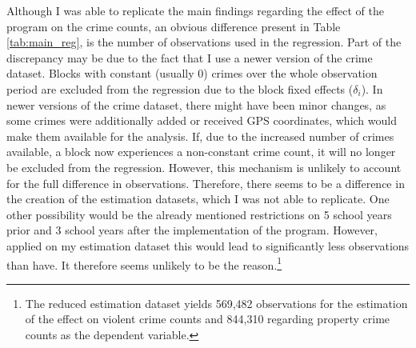 \documentclass[]{article}
\begin{document}
Although I was able to replicate the main findings regarding the effect of the program on the crime counts, an obvious difference present in Table \ref{tab:main_reg}, is the number of observations used in the regression. Part of the discrepancy may be due to the fact that I use a newer version of the crime dataset. Blocks with constant (usually 0) crimes over the whole observation period are excluded from the regression due to the block fixed effects ($\delta_i$). In newer versions of the crime dataset, there might have been minor changes, as some crimes were additionally added or received GPS coordinates, which would make them available for the analysis. If, due to the increased number of crimes available, a block now experiences a non-constant crime count, it will no longer be excluded from the regression. However, this mechanism is unlikely to account for the full difference in observations. Therefore, there seems to be a difference in the creation of the estimation datasets, which I was not able to replicate. One other possibility would be the already mentioned restrictions on 5 school years prior and 3 school years after the implementation of the program. However, applied on my estimation dataset this would lead to significantly less observations than \cite{mcmillen2017} have. It therefore seems unlikely to be the reason.\footnote{The reduced estimation dataset yields 569,482 observations for the estimation of the effect on violent crime counts and 844,310 regarding property crime counts as the dependent variable.}

\newpage

\end{document}
